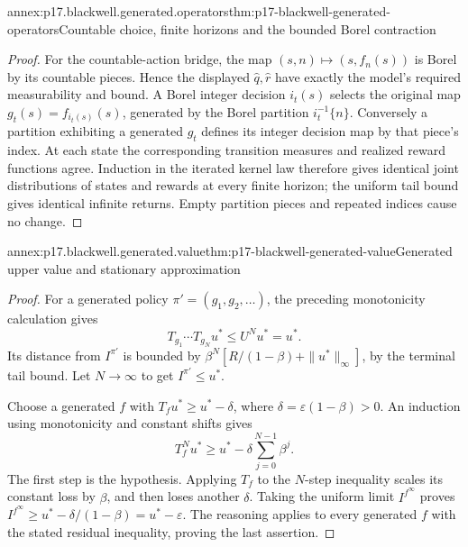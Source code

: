 \begin{annexitem}{annex:p17.blackwell.generated.operators}{thm:p17-blackwell-generated-operators}{Countable choice, finite horizons and the bounded Borel contraction}
\begin{proof}
For the countable-action bridge, the map
\((s,n)\mapsto(s,f_n(s))\) is Borel by its countable
pieces. Hence the displayed \(\widehat q,\widehat r\)
have exactly the model's required measurability and bound.
A Borel integer decision \(i_t(s)\) selects the original
map \(g_t(s)=f_{i_t(s)}(s)\), generated by the Borel
partition \(i_t^{-1}\{n\}\). Conversely a partition
exhibiting a generated \(g_t\) defines its integer
decision map by that piece's index. At each state the
corresponding transition measures and realized reward
functions agree. Induction in the iterated kernel law
therefore gives identical joint distributions of states
and rewards at every finite horizon; the uniform tail
bound gives identical infinite returns. Empty partition
pieces and repeated indices cause no change.
\end{proof}
\end{annexitem}

\begin{annexitem}{annex:p17.blackwell.generated.value}{thm:p17-blackwell-generated-value}{Generated upper value and stationary approximation}
\begin{proof}
For a generated policy \(\pi'=(g_1,g_2,\ldots)\),
the preceding monotonicity calculation gives
\[
             T_{g_1}\cdots T_{g_N}u^*
                            \leq U^Nu^*=u^*.
\]
Its distance from \(I^{\pi'}\) is bounded by
\(\beta^N[R/(1-\beta)+\|u^*\|_\infty]\), by the
terminal tail bound. Let \(N\to\infty\) to get
\(I^{\pi'}\leq u^*\).

Choose a generated \(f\) with
\(T_fu^*\geq u^*-\delta\), where
\(\delta=\varepsilon(1-\beta)>0\).
An induction using monotonicity and constant shifts gives
\[
              T_f^Nu^*\geq
                    u^*-\delta\sum_{j=0}^{N-1}\beta^j.
\]
The first step is the hypothesis. Applying \(T_f\) to
the \(N\)-step inequality scales its constant loss by
\(\beta\), and then loses another \(\delta\).
Taking the uniform limit \(I^{f^\infty}\) proves
\(I^{f^\infty}\geq u^*-\delta/(1-\beta)=u^*-\varepsilon\).
The reasoning applies to every generated \(f\) with the
stated residual inequality, proving the last assertion.
\end{proof}
\end{annexitem}


